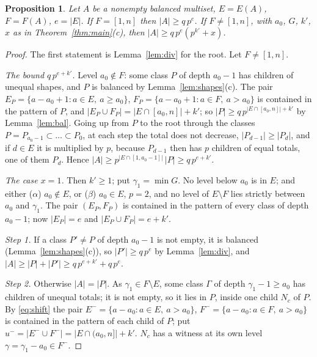 \documentclass[11pt,a4paper]{amsart}
\newtheorem{proposition}[theorem]{Proposition}
\theoremstyle{definition}
\theoremstyle{remark}
\begin{document}
\begin{proposition}\label{prop:B}
Let $A$ be a nonempty balanced multiset, $E=E(A)$, $F=F(A)$, $e=|E|$.
If $F=[1,n]$ then $|A|\ge q\,p^{e}$. If $F\ne[1,n]$, with $a_0$, $G$, $k'$, $x$ as in
Theorem~\ref{thm:main}(c), then $|A|\ge q\,p^{e}(p^{k'}+x)$.
\end{proposition}
\begin{proof}
The first statement is Lemma~\ref{lem:div} for the root. Let $F\ne[1,n]$.

\emph{The bound $q\,p^{e+k'}$.} Level $a_0\notin F$: some class $P$ of depth $a_0-1$ has children of unequal
shapes, and $P$ is balanced by Lemma~\ref{lem:shapes}(c). The pair
$E_P=\{a-a_0+1:a\in E,\ a\ge a_0\}$, $F_P=\{a-a_0+1:a\in F,\ a>a_0\}$ is contained in the pattern of $P$, and
$|E_P\cup F_P|=|E\cap[a_0,n]|+k'$; so $|P|\ge q\,p^{|E\cap[a_0,n]|+k'}$ by Lemma~\ref{lem:bal}. Going up from
$P$ to the root through the classes $P=P_{a_0-1}\subset\dots\subset P_0$, at each step the total does not decrease, $|P_{d-1}|\ge|P_d|$, and if $d\in E$ it is multiplied by $p$,
because $P_{d-1}$ then has $p$ children of equal totals, one of them $P_d$. Hence
$|A|\ge p^{|E\cap[1,a_0-1]|}\,|P|\ge q\,p^{e+k'}$.

\emph{The case $x=1$.} Then $k'\ge1$; put $\gamma_1=\min G$. No level below $a_0$ is in $E$; and either
($\alpha$) $a_0\notin E$, or ($\beta$) $a_0\in E$, $p=2$, and no level of $E\setminus F$ lies strictly between
$a_0$ and $\gamma_1$. The pair $(E_P,F_P)$ is contained in the pattern of every class of depth $a_0-1$; now
$|E_P|=e$ and $|E_P\cup F_P|=e+k'$.

\emph{Step 1.} If a class $P'\ne P$ of depth $a_0-1$ is not empty, it is balanced
(Lemma~\ref{lem:shapes}(c)), so $|P'|\ge q\,p^e$ by Lemma~\ref{lem:div}, and
$|A|\ge|P|+|P'|\ge q\,p^{e+k'}+q\,p^e$.

\emph{Step 2.} Otherwise $|A|=|P|$. As $\gamma_1\in F\setminus E$, some class $\Gamma$ of depth $\gamma_1-1\ge a_0$ has
children of unequal totals; it is not empty, so it lies in $P$, inside one child $N_c$ of $P$. By
\eqref{eq:shift} the pair $E^-=\{a-a_0:a\in E,\ a>a_0\}$, $F^-=\{a-a_0:a\in F,\ a>a_0\}$ is contained in the
pattern of each child of $P$; put $u^-=|E^-\cup F^-|=|E\cap(a_0,n]|+k'$. $N_c$ has a witness at its own level
$\gamma=\gamma_1-a_0\in F^-$.


\end{proof}
\end{document}
